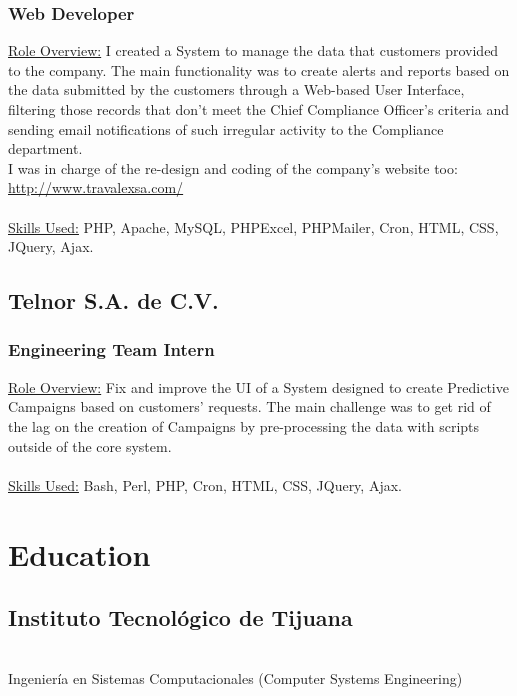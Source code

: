 \documentclass[letterpaper, 11pt]{article}
\begin{document}
	\subsubsection*{Web Developer}
	\underline{Role Overview:} 
	I created a System to manage the data that customers provided to the company. 
The main functionality was to create alerts and reports based on the data submitted by the customers through a Web-based User Interface, filtering those records that don’t meet the Chief Compliance Officer’s criteria and sending email notifications of such irregular activity to the Compliance department.\\

I was in charge of the re-design and coding of the company’s website too:\\ 
\href{http://www.travalexsa.com/}{http://www.travalexsa.com/}\\\\
	\underline{Skills Used:}
	PHP, Apache, MySQL, PHPExcel, PHPMailer, Cron, HTML, CSS, JQuery, Ajax.
	\subsection*{\LARGE{\textbf{Telnor S.A. de C.V.}}}
	\subsubsection*{Engineering Team Intern}
	\underline{Role Overview:} 
	Fix and improve the UI of a System designed to create Predictive Campaigns based on customers’ requests. The main challenge was to get rid of the lag on the creation of Campaigns by pre-processing the data with scripts outside of the core system.\\\\
	\underline{Skills Used:}
	Bash, Perl, PHP, Cron, HTML, CSS, JQuery, Ajax.
	\section*{\huge{Education}}
	\noindent\makebox[\linewidth]{\rule{\textwidth}{0.5pt}} 
	\subsection*{\LARGE{\textbf{Instituto Tecnológico de Tijuana}}}
	\\
	Ingeniería en Sistemas Computacionales (Computer Systems Engineering)\\
\end{document}
